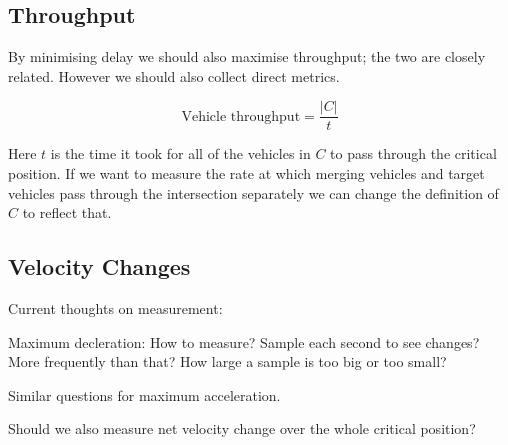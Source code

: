 
\subsection{Throughput}
\label{subsec:Throughput}
By minimising delay we should also maximise throughput; the two are closely related. However we should also collect direct metrics.

\begin{equation}
\text{Vehicle throughput} = \frac{|C|}{t}
\end{equation}

Here $t$ is the time it took for all of the vehicles in $C$ to pass through the critical position. If we want to measure the rate at which merging vehicles and target vehicles pass through the intersection separately we can change the definition of $C$ to reflect that.

\subsection{Velocity Changes}
\label{subsec:Velocity Changes}


Current thoughts on measurement:

Maximum decleration: How to measure? Sample each second to see changes? More frequently than that? How large a sample is too big or too small?

Similar questions for maximum acceleration.

Should we also measure net velocity change over the whole critical position?